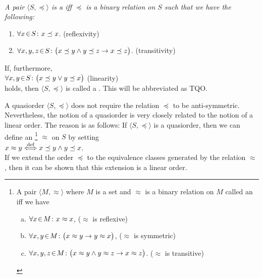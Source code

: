 \begin{Definition}[Quasiorder]  \hspace*{\fill} \\
{\em
  A pair $\langle S, \preceq\rangle$ is a    iff $\preceq$ is a 
  binary relation on $S$ such that we have the following:
  \begin{enumerate}
  \item $\forall x \!\in\! S\colon x \preceq x$. \hspace*{\fill} (reflexivity)
  \item $\forall x, y, z \!\in\! S \colon \bigl(x \preceq y \wedge y \preceq z \rightarrow x \preceq z\bigr)$. 
         \hspace*{\fill} (transitivity)
  \end{enumerate}
  If, furthermore,
  \\[0.2cm]
  \hspace*{1.3cm}
  $\forall x, y \!\in\! S \colon \bigl(x \preceq y \vee y \preceq x\bigr)$ \hspace*{\fill} (linearity) 
  \\[0.2cm]
  holds, then $\langle S, \preceq \rangle$ is called a .  This will be
  abbreviated as \textsc{TQO}.
}
\end{Definition}
A quasiorder $\langle S, \preceq \rangle$ does not require the relation $\preceq$ to be
anti-symmetric.  Nevertheless, the notion of a quasiorder is very closely related to the notion of a
linear order.  The reason is as follows:  If $\langle S, \preceq \rangle$ is a quasiorder, then we
can define an \footnote{
  A pair $\langle M, \approx \rangle$ where $M$ is a set and $\approx$ is a binary relation on $M$ called an
   iff we have
  \begin{enumerate}[(a)]
  \item $\forall x \!\in\! M \colon x \approx x$,                      \hspace*{\fill} ($\approx$ is reflexive)
  \item $\forall x, y \!\in\! M \colon \bigl(x \approx y \rightarrow y \approx x\bigr)$,
        \hspace*{\fill} ($\approx$ is symmetric)
  \item $\forall x, y, z \!\in\! M \colon \bigl(x \approx y \wedge y \approx z \rightarrow x \approx z\bigr)$.
        \hspace*{\fill} ($\approx$ is transitive)
\end{enumerate}
}
$\approx$ on $S$ by setting
\\[0.2cm]
\hspace*{1.3cm}
$x \approx y \stackrel{\mbox{\scriptsize def}}{\Longleftrightarrow} x \preceq y \wedge y \preceq x$. 
\\[0.2cm]
If we extend the order $\preceq$ to the equivalence classes generated by the relation $\approx$,
then it can be shown that this extension is a linear order.
\vspace*{0.3cm}

